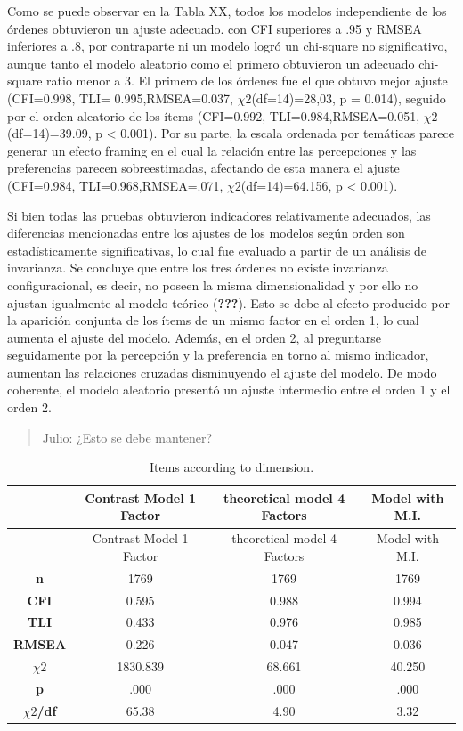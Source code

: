\documentclass[
]{article}
\begin{document}
Como se puede observar en la Tabla XX, todos los modelos independiente de los órdenes obtuvieron un ajuste adecuado. con CFI superiores a .95 y RMSEA inferiores a .8, por contraparte ni un modelo logró un chi-square no significativo, aunque tanto el modelo aleatorio como el primero obtuvieron un adecuado chi-square ratio menor a 3. El primero de los órdenes fue el que obtuvo mejor ajuste (CFI=0.998, TLI= 0.995,RMSEA=0.037, \(\chi2\)(df=14)=28,03, p = 0.014), seguido por el orden aleatorio de los ítems (CFI=0.992, TLI=0.984,RMSEA=0.051, \(\chi2\)(df=14)=39.09, p \textless{} 0.001). Por su parte, la escala ordenada por temáticas parece generar un efecto framing en el cual la relación entre las percepciones y las preferencias parecen sobreestimadas, afectando de esta manera el ajuste (CFI=0.984, TLI=0.968,RMSEA=.071, \(\chi2\)(df=14)=64.156, p \textless{} 0.001).

Si bien todas las pruebas obtuvieron indicadores relativamente adecuados, las diferencias mencionadas entre los ajustes de los modelos según orden son estadísticamente significativas, lo cual fue evaluado a partir de un análisis de invarianza. Se concluye que entre los tres órdenes no existe invarianza configuracional, es decir, no poseen la misma dimensionalidad y por ello no ajustan igualmente al modelo teórico ({\textbf{???}}). Esto se debe al efecto producido por la aparición conjunta de los ítems de un mismo factor en el orden 1, lo cual aumenta el ajuste del modelo. Además, en el orden 2, al preguntarse seguidamente por la percepción y la preferencia en torno al mismo indicador, aumentan las relaciones cruzadas disminuyendo el ajuste del modelo. De modo coherente, el modelo aleatorio presentó un ajuste intermedio entre el orden 1 y el orden 2.

\pagebreak

\begin{quote}
Julio: ¿Esto se debe mantener?
\end{quote}

\begin{longtable}[]{@{}cccc@{}}
\caption{Items according to dimension.}\tabularnewline
\toprule
& Contrast Model 1 Factor & theoretical model 4 Factors & Model with M.I.\tabularnewline
\midrule
\endfirsthead
\toprule
& Contrast Model 1 Factor & theoretical model 4 Factors & Model with M.I.\tabularnewline
\midrule
\endhead
\textbf{n} & 1769 & 1769 & 1769\tabularnewline
\textbf{CFI} & 0.595 & 0.988 & 0.994\tabularnewline
\textbf{TLI} & 0.433 & 0.976 & 0.985\tabularnewline
\textbf{RMSEA} & 0.226 & 0.047 & 0.036\tabularnewline
\textbf{\(\chi2\)} & 1830.839 & 68.661 & 40.250\tabularnewline
\textbf{p} & .000 & .000 & .000\tabularnewline
\textbf{\(\chi2\)/df} & 65.38 & 4.90 & 3.32\tabularnewline
\bottomrule
\end{longtable}
\end{document}
